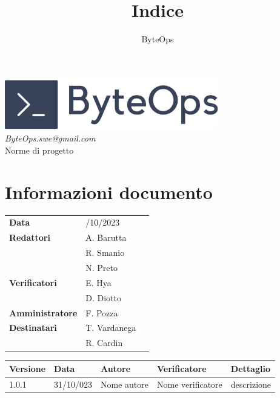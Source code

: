 \documentclass{article}
\title{\textbf{\fontsize{28}{6}\selectfont Indice}}
\author{\fontsize{14}{6}\selectfont ByteOps}
\begin{document}
\pagestyle{fancy}
\begin{center}
\includegraphics[width = 0.7\textwidth]{../../Images/logo.png} \\
\vspace{0.2cm}
\textcolor[RGB]{60, 60, 60}{\textit{ByteOps.swe@gmail.com}} \\
\vspace{2cm}
\fontsize{16}{6}\selectfont Norme di progetto \\ 
\vspace{0.5cm}
\end{center}

\section*{Informazioni documento}
\def\arraystretch{1.2}
\begin{tabular}{>{\raggedleft\arraybackslash}p{}|>{\raggedright\arraybackslash}p{}c}
\hline
\addlinespace
    \textbf{Data} & 30/10/2023 \vspace{10pt} \\
    \textbf{Redattori} & A. Barutta \\ & R. Smanio \\ & N. Preto \vspace{10pt} \\
    \textbf{Verificatori} & E. Hya  \\ & D. Diotto \vspace{10pt} \\
    \textbf{Amministratore} & F. Pozza \vspace{10pt} \\
    \textbf{Destinatari} & T. Vardanega \\ & R. Cardin \vspace{10pt} \\
\end{tabular}
\pagebreak 


\begin{tabular}{|C{2.5cm}|C{2.5cm}|C{2.5cm}|C{2.5cm}|C{2.5cm}|}
    \hline
    \textbf{Versione} & \textbf{Data} & \textbf{Autore} & \textbf{Verificatore} & \textbf{Dettaglio} \\
    \hline \hline
    \label{Git_Action_Version} 1.0.1 & 31/10/023 & Nome autore & Nome verificatore & descrizione \\
    \hline

\end{tabular}
\end{document}
